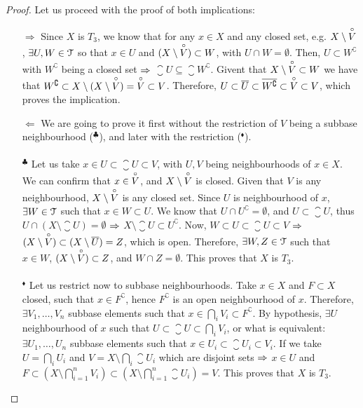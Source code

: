 \begin{proof}
	Let us proceed with the proof of both implications:
	\begin{itemize}
		\item[$\boxed{\Rightarrow}$] Since $X$ is $T_3$, we know that for any $x\in X$ and any closed set, e.g. $X\setminus \overset{\circ}{V}$, $\exists U,W\in \EuScript{T}$ so that $x\in U$ and $(X\setminus \overset{\circ}{V})\subset W$, with $U\cap W=\emptyset$. Then, $U\subset W^\complement$ with $W^\complement$ being a closed set $\Rightarrow$ $\closure{U}\subseteq\closure{W^\complement}$. Givent that $X\setminus \overset{\circ}{V}\subset W$ we have that $W^\complement \subset X\setminus (X\setminus \overset{\circ}{V}) = \overset{\circ}{V}\subset V$. Therefore, $U\subset \overline{U}\subset \overline{W^\complement}\subset \overset{\circ}{V}\subset V$, which proves the implication.
		\item[$\boxed{\Leftarrow}$] We are going to prove it first without the restriction of $V$ being a subbase neighbourhood ($^\clubsuit$), and later with the restriction ($^\blacklozenge$).\\
		\\
		$^\clubsuit$ Let us take $x	\in U\subset\closure{U}\subset V$, with $U,V$ being neighbourhoods of $x\in X$. We can confirm that $x\in\overset{\circ}{V}$, and $X\setminus \overset{\circ}{V}$ is closed. Given that $V$ is any neighbourhood, $X\setminus \overset{\circ}{V}$ is any closed set. Since $U$ is neighbourhood of $x$, $\exists W\in \EuScript{T}$ such that $x\in W\subset U$.
		We know that $U\cap U^\complement = \emptyset$, and $U\subset \closure{U}$, thus $U\cap (X\setminus \closure{U})=\emptyset$ $\Rightarrow$ $X\setminus \closure{U}\subset U^\complement$.
		Now, $W\subset U\subset \closure{U}\subset V$ $\Rightarrow$ $(X\setminus\overset{\circ}{V})\subset (X\setminus\overline{U})=Z$, which is open. Therefore, $\exists W, Z\in \EuScript{T}$ such that $x\in W$, $(X\setminus \overset{\circ}{V})\subset Z$, and $W\cap Z = \emptyset$. This proves that $X$ is $T_3$.\\
		\\$^\blacklozenge$ Let us restrict now to subbase neighbourhoods. Take $x\in X$ and $F\subset X$ closed, such that $x\in F^\complement$, hence $F^\complement$ is an open neighbourhood of $x$. Therefore, $\exists V_1,\dots, V_n$ subbase elements such that $x\in\bigcap_{i}V_i\subset F^\complement$. By hypothesis, $\exists U$ neighbourhood of $x$ such that $U\subset \closure{U} \subset \bigcap_{i}V_i$, or what is equivalent: $\exists U_1,\dots, U_n$ subbase elements such that $x\in U_i\subset \closure{U_i}\subset V_i$. If we take $U=\bigcap_{i}U_i$ and $V=X\setminus\bigcap_{i}\closure{U}_i$ which are disjoint sets $\Rightarrow$ $x\in U$ and $F\subset (X\setminus \bigcap_{i=1}^n V_i) \subset (X\setminus \bigcap_{i=1}^n\closure{U}_i)=V$. This proves that $X$ is $T_3$.
	\end{itemize}
\end{proof}


